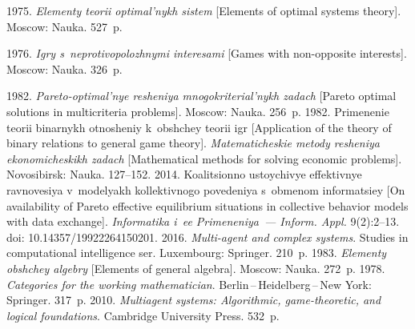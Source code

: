 


  


  \begin{multicols}{2}

\renewcommand{\bibname}{\protect\rmfamily References}

{\small\frenchspacing
 {%
 \begin{thebibliography}{99} 

 1975. \textit{Ele\-men\-ty teo\-rii op\-ti\-mal'\-nykh sis\-tem} [Elements of optimal systems 
theory]. Moscow: Nauka. 527~p.

 1976. \textit{Ig\-ry s~nep\-ro\-ti\-vo\-po\-lozh\-ny\-mi in\-te\-re\-sa\-mi} 
 [Games with non-opposite interests]. Moscow: Nauka. 326~p.
 
 1982. \textit{Pa\-re\-to-optimal'nye re\-she\-niya 
mno\-go\-kri\-te\-ri\-al'\-nykh za\-dach} [Pareto optimal solutions in multicriteria problems]. Moscow: Nauka. 
256~p.
 1982. Pri\-me\-ne\-nie teo\-rii bi\-nar\-nykh ot\-no\-she\-niy k~ob\-shchey teo\-rii igr [Application 
of the theory of binary relations to general game theory]. \textit{Matematicheskie metody resheniya 
ekonomicheskikh zadach} [Mathematical methods for solving economic problems]. Novosibirsk: Nauka. 127--152.
 2014. Ko\-a\-li\-tsi\-on\-no us\-toy\-chi\-vye ef\-fek\-tiv\-nye rav\-no\-ve\-siya v~mo\-de\-lyakh 
kol\-lek\-tiv\-no\-go po\-ve\-de\-niya s~ob\-me\-nom in\-for\-ma\-tsi\-ey [On availability of Pareto effective equilibrium 
situations in collective behavior models with data exchange]. \textit{Informatika i~ee Primeneniya~--- 
Inform. Appl.} 9(2):2--13. doi: 10.14357/19922264150201.
 2016. \textit{Multi-agent and complex systems}. 
Studies in computational intelligence ser. Luxembourg: Springer. 210~p.
 1983. \textit{Ele\-men\-ty ob\-shchey al\-geb\-ry} [Elements of general algebra]. 
Moscow: Nauka. 272~p.
 1978. \textit{Categories for the working mathematician}.  
Berlin\,--\,Heidelberg\,--\,New York: Springer. 317~p.
 2010. \textit{Multiagent systems: Algorithmic, game-theoretic, 
and logical foundations}. Cambridge University Press. 532~p.


\end{thebibliography}}}
\end{multicols}
